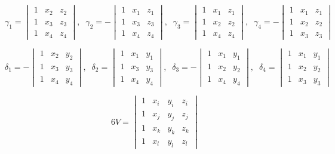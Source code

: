 \begin{equation}
{\gamma_{1}
=
\begin{vmatrix}
1 & x_{2} & z_{2} \\
1 & x_{3} & z_{3} \\
1 & x_{4} & z_{4}
\end{vmatrix}},\;\;
{\gamma_{2}
= -
\begin{vmatrix}
1 & x_{1} & z_{1} \\
1 & x_{3} & z_{3} \\
1 & x_{4} & z_{4}
\end{vmatrix}},\;\;
{\gamma_{3}
=
\begin{vmatrix}
1 & x_{1} & z_{1} \\
1 & x_{2} & z_{2} \\
1 & x_{4} & z_{4}
\end{vmatrix}},\;\;
{\gamma_{4}
= -
\begin{vmatrix}
1 & x_{1} & z_{1} \\
1 & x_{2} & z_{2} \\
1 & x_{3} & z_{3}
\end{vmatrix}}
\label{fig:gammacalc}
\end{equation}

\begin{equation}
{\delta_{1}
= -
\begin{vmatrix}
1 & x_{2} & y_{2} \\
1 & x_{3} & y_{3} \\
1 & x_{4} & y_{4}
\end{vmatrix}},\;\;
{\delta_{2}
=
\begin{vmatrix}
1 & x_{1} & y_{1} \\
1 & x_{3} & y_{3} \\
1 & x_{4} & y_{4}
\end{vmatrix}},\;\;
{\delta_{3}
= -
\begin{vmatrix}
1 & x_{1} & y_{1} \\
1 & x_{2} & y_{2} \\
1 & x_{4} & y_{4}
\end{vmatrix}},\;\;
{\delta_{4}
=
\begin{vmatrix}
1 & x_{1} & y_{1} \\
1 & x_{2} & y_{2} \\
1 & x_{3} & y_{3}
\end{vmatrix}}
\label{fig:deltacalc}
\end{equation}

\begin{equation}
{6V
=
\begin{vmatrix}
1 & x_{i} & y_{i} & z_{i} \\
1 & x_{j} & y_{j} & z_{j} \\
1 & x_{k} & y_{k} & z_{k} \\
1 & x_{l} & y_{l} & z_{l}
\end{vmatrix}}
\label{eqn:volcalc}
\end{equation}

